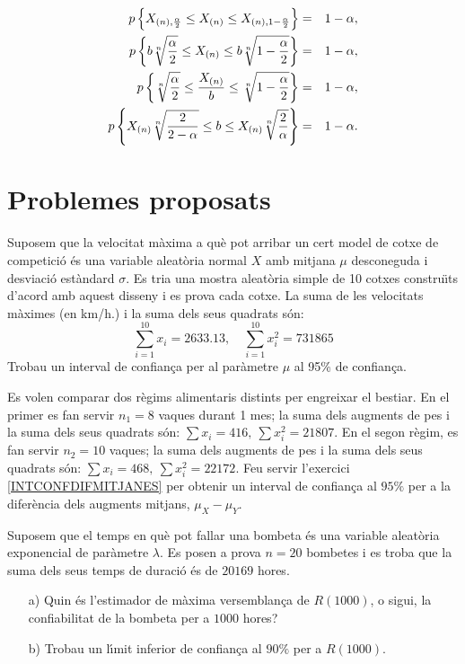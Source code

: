 {\begin{eqnarray*}
\pp{X_{(n),\frac{\alpha}{2}}\leq X_{(n)}\leq 
X_{(n),1-\frac{\alpha}{2}} 
}& = &
1-\alpha, \\
\pp{
b\root n\of{\frac{\alpha}{2}}\leq X_{(n)}\leq 
b\root n\of{1-\frac{\alpha}{2}}}& = & 1-\alpha, \\
\pp{
\root n\of{\frac{\alpha}{2}}\leq \frac{X_{(n)}}{b}\leq 
\root n\of{1-\frac{\alpha}{2}}}& =&  1-\alpha, \\
\pp{ X_{(n)}\root n\of{\frac{2}{2-\alpha}}\leq b\leq 
X_{(n)}\root n\of{\frac{2}{\alpha}}} & =&  1-\alpha.
\end{eqnarray*}
}

\section{Problemes proposats}

\begin{prob}
Suposem que la velocitat m\`axima a qu\`e pot arribar un cert model de
cotxe de competici\'o \'es una variable aleat\`oria normal $X$ amb mitjana 
$\mu$ desconeguda i
desviaci\'o est\`andard $\sigma$. Es tria una mostra aleat\`oria simple 
de 10 cotxes constru\"{\i}ts
d'acord amb aquest disseny i es prova cada cotxe. La suma 
de les velocitats m\`aximes (en km/h.) i la suma dels seus
quadrats  s\'on:
$$\sum_{i=1}^{10} x_i =2633.13,\quad \sum_{i=1}^{10} x_i^2 =731865$$
Trobau un interval de confian\c{c}a per al par\`ametre $\mu$ al 95\% de
confian\c{c}a. 
\end{prob}

\begin{prob}
Es volen comparar dos r\`egims alimentaris distints per engreixar el
bestiar. En el primer es fan servir $n_1=8$ vaques durant 1 mes; la suma 
dels augments de pes 
i la suma dels seus quadrats s\'on: $\sum
x_i=416,\ \sum x_i^2 =21807$. En el segon r\`egim, es fan servir $n_2 =10$ 
vaques;
la suma dels augments de pes i la suma dels seus quadrats s\'on:
$\sum x_i=468,\ \sum x_i^2 =22172$.\newline
Feu servir l'exercici \ref{INTCONFDIFMITJANES}
per obtenir un interval de confian\c{c}a al $95\%$
per a la difer\`encia dels augments mitjans, $\mu_X -\mu_Y$.
\end{prob}

\enlargethispage*{1000pt}

\begin{prob}
Suposem que el temps en qu\`e pot fallar una bombeta \'es una variable
aleat\`oria exponencial de par\`ametre $\lambda$. Es posen a prova $n=20$
bombetes i es troba que la suma dels seus temps de
duraci\'o \'es de $20169$ hores.
\begin{itemize}
\item[a)]{Quin \'es l'estimador de m\`axima versemblan\c{c}a 
de $R(1000)$, o sigui, la
confiabilitat de la bombeta per a $1000$ hores?}
\item[b)]{Trobau un l\'{\i}mit inferior de confian\c{c}a 
al $90\%$ per a $R(1000)$.}
\end{itemize}
\end{prob}

